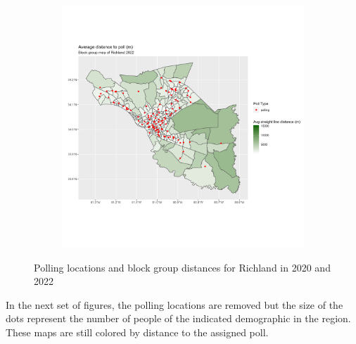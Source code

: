 \documentclass[11pt]{article}
\theoremstyle{remark}
\theoremstyle{definition}
\begin{document}
\begin{figure}
\begin{subfigure}{.5\textwidth}
		\includegraphics[width=\linewidth]{result analysis/Richland_SC_original_configs/distance_map_Richland_config_original_2022_polls.png}
		\label{sfig:Richland_2022_bg_dist}
	\end{subfigure}
	\caption{Polling locations and block group distances for Richland in 2020 and 2022}
	\label{fig:Richland distance maps}
\end{figure}

In the next set of figures, the polling locations are removed but the size of the dots represent the number of people of the indicated demographic in the region. These maps are still colored by distance to the assigned poll.
\end{document}
